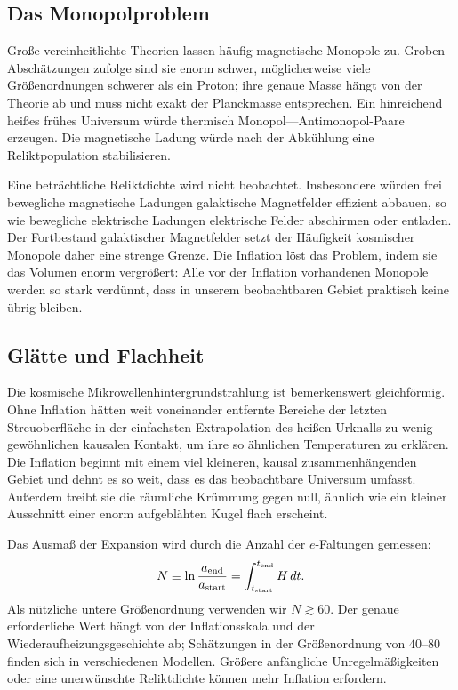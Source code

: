 \subsection{Das Monopolproblem}

Große vereinheitlichte Theorien lassen häufig magnetische Monopole zu. Groben Abschätzungen zufolge sind sie enorm schwer, möglicherweise viele Größenordnungen schwerer als ein Proton; ihre genaue Masse hängt von der Theorie ab und muss nicht exakt der Planckmasse entsprechen. Ein hinreichend heißes frühes Universum würde thermisch Monopol---Antimonopol-Paare erzeugen. Die magnetische Ladung würde nach der Abkühlung eine Reliktpopulation stabilisieren.

Eine beträchtliche Reliktdichte wird nicht beobachtet. Insbesondere würden frei bewegliche magnetische Ladungen galaktische Magnetfelder effizient abbauen, so wie bewegliche elektrische Ladungen elektrische Felder abschirmen oder entladen. Der Fortbestand galaktischer Magnetfelder setzt der Häufigkeit kosmischer Monopole daher eine strenge Grenze. Die Inflation löst das Problem, indem sie das Volumen enorm vergrößert: Alle vor der Inflation vorhandenen Monopole werden so stark verdünnt, dass in unserem beobachtbaren Gebiet praktisch keine übrig bleiben.

\subsection{Glätte und Flachheit}

Die kosmische Mikrowellenhintergrundstrahlung ist bemerkenswert gleichförmig. Ohne Inflation hätten weit voneinander entfernte Bereiche der letzten Streuoberfläche in der einfachsten Extrapolation des heißen Urknalls zu wenig gewöhnlichen kausalen Kontakt, um ihre so ähnlichen Temperaturen zu erklären. Die Inflation beginnt mit einem viel kleineren, kausal zusammenhängenden Gebiet und dehnt es so weit, dass es das beobachtbare Universum umfasst. Außerdem treibt sie die räumliche Krümmung gegen null, ähnlich wie ein kleiner Ausschnitt einer enorm aufgeblähten Kugel flach erscheint.

Das Ausmaß der Expansion wird durch die Anzahl der \(e\)-Faltungen gemessen:
\begin{equation}
N\equiv \ln\frac{a_{\rm end}}{a_{\rm start}}
=\int_{t_{\rm start}}^{t_{\rm end}}H\,dt.
\label{eq:c09-efolds}
\end{equation}
Als nützliche untere Größenordnung verwenden wir \(N\gtrsim60\). Der genaue erforderliche Wert hängt von der Inflationsskala und der Wiederaufheizungsgeschichte ab; Schätzungen in der Größenordnung von \(40\)--\(80\) finden sich in verschiedenen Modellen. Größere anfängliche Unregelmäßigkeiten oder eine unerwünschte Reliktdichte können mehr Inflation erfordern.

